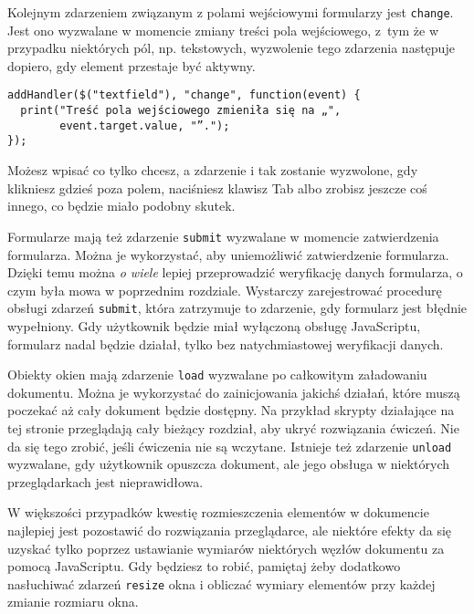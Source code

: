 Kolejnym zdarzeniem związanym z polami wejściowymi formularzy jest \texttt{change}. Jest ono wyzwalane w momencie zmiany treści pola wejściowego, z~tym że w przypadku niektórych pól, np. tekstowych, wyzwolenie tego zdarzenia następuje dopiero, gdy element przestaje być aktywny.

  
\begin{verbatim} 
addHandler($("textfield"), "change", function(event) {
  print("Treść pola wejściowego zmieniła się na „",
        event.target.value, "”.");
});
 \end{verbatim}
  
Możesz wpisać co tylko chcesz, a zdarzenie i tak zostanie wyzwolone, gdy klikniesz gdzieś poza polem, naciśniesz klawisz Tab albo zrobisz jeszcze coś innego, co będzie miało podobny skutek.

  
Formularze mają też zdarzenie \texttt{submit} wyzwalane w momencie zatwierdzenia formularza. Można je wykorzystać, aby uniemożliwić zatwierdzenie formularza. Dzięki temu można \emph{o wiele} lepiej przeprowadzić weryfikację danych formularza, o czym była mowa w poprzednim rozdziale. Wystarczy zarejestrować procedurę obsługi zdarzeń \texttt{submit}, która zatrzymuje to zdarzenie, gdy formularz jest błędnie wypełniony. Gdy użytkownik będzie miał wyłączoną obsługę JavaScriptu, formularz nadal będzie działał, tylko bez natychmiastowej weryfikacji danych.

  
Obiekty okien mają zdarzenie \texttt{load} wyzwalane po całkowitym załadowaniu dokumentu. Można je wykorzystać do zainicjowania jakichś działań, które muszą poczekać aż cały dokument będzie dostępny. Na przykład skrypty działające na tej stronie przeglądają cały bieżący rozdział, aby ukryć rozwiązania ćwiczeń. Nie da się tego zrobić, jeśli ćwiczenia nie są wczytane. Istnieje też zdarzenie \texttt{unload} wyzwalane, gdy użytkownik opuszcza dokument, ale jego obsługa w niektórych przeglądarkach jest nieprawidłowa.

  
W większości przypadków kwestię rozmieszczenia elementów w dokumencie najlepiej jest pozostawić do rozwiązania przeglądarce, ale niektóre efekty da się uzyskać tylko poprzez ustawianie wymiarów niektórych węzłów dokumentu za pomocą JavaScriptu. Gdy będziesz to robić, pamiętaj żeby dodatkowo nasłuchiwać zdarzeń \texttt{resize} okna i obliczać wymiary elementów przy każdej zmianie rozmiaru okna.